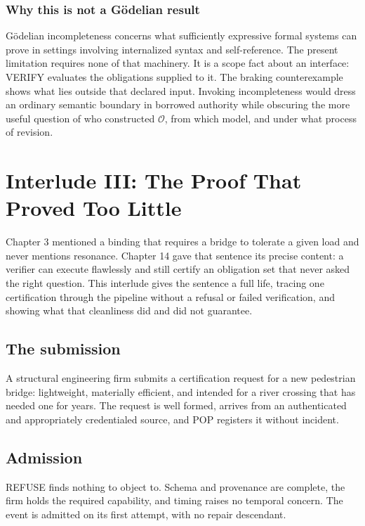\documentclass[11pt,openany]{book}
\newcommand{\interlude}{\cleardoublepage}
\begin{document}
\subsection{Why this is not a G\"odelian result}

G\"odelian incompleteness concerns what sufficiently expressive formal systems
can prove in settings involving internalized syntax and self-reference. The
present limitation requires none of that machinery. It is a scope fact about
an interface: VERIFY evaluates the obligations supplied to it. The braking
counterexample shows what lies outside that declared input. Invoking
incompleteness would dress an ordinary semantic boundary in borrowed authority
while obscuring the more useful question of who constructed \(\mathcal O\),
from which model, and under what process of revision.

\interlude
\chapter*{Interlude III: The Proof That Proved Too Little}

Chapter 3 mentioned a binding that requires a bridge to tolerate a given load
and never mentions resonance. Chapter 14 gave that sentence its precise
content: a verifier can execute flawlessly and still certify an obligation set
that never asked the right question. This interlude gives the sentence a full
life, tracing one certification through the pipeline without a refusal or
failed verification, and showing what that cleanliness did and did not
guarantee.

\section*{The submission}

A structural engineering firm submits a certification request for a new
pedestrian bridge: lightweight, materially efficient, and intended for a river
crossing that has needed one for years. The request is well formed, arrives
from an authenticated and appropriately credentialed source, and POP registers
it without incident.

\section*{Admission}

REFUSE finds nothing to object to. Schema and provenance are complete, the firm
holds the required capability, and timing raises no temporal concern. The event
is admitted on its first attempt, with no repair descendant.
\end{document}
